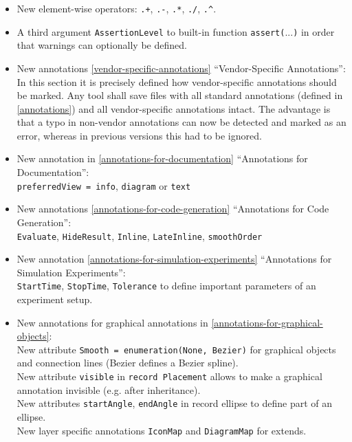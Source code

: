 \begin{itemize}
\item
  New element-wise operators: \lstinline!.+!, \lstinline!.-!, \lstinline!.*!, \lstinline!./!, \lstinline!.^!.
\item
  A third argument \lstinline!AssertionLevel! to built-in function \lstinline!assert(!...\lstinline!)! in
  order that warnings can optionally be defined.
\item
  New annotations \autoref{vendor-specific-annotations} ``Vendor-Specific Annotations'':\\
  In this section it is precisely defined how vendor-specific
  annotations should be marked. Any tool shall save files with all
  standard annotations (defined in \autoref{annotations}) and all vendor-specific
  annotations intact. The advantage is that a typo in non-vendor
  annotations can now be detected and marked as an error, whereas in
  previous versions this had to be ignored.
\item
  New annotation in \autoref{annotations-for-documentation} ``Annotations for Documentation'':\\
  \lstinline!preferredView = info!, \lstinline!diagram! or \lstinline!text!
\item
  New annotations \autoref{annotations-for-code-generation} ``Annotations for Code Generation'':\\
  \lstinline!Evaluate!, \lstinline!HideResult!, \lstinline!Inline!,
	\lstinline!LateInline!, \lstinline!smoothOrder!
\item
  New annotation \autoref{annotations-for-simulation-experiments} ``Annotations for Simulation
  Experiments'':\\
  \lstinline!StartTime!, \lstinline!StopTime!, \lstinline!Tolerance! to define important parameters of an
  experiment setup.
\item
  New annotations for graphical annotations in \autoref{annotations-for-graphical-objects}:\\
  New attribute \lstinline!Smooth = enumeration(None, Bezier)! for graphical objects
  and connection lines (Bezier defines a Bezier spline).\\
  New attribute \lstinline!visible! in \lstinline!record Placement! allows to make a graphical
  annotation invisible (e.g. after inheritance).\\
  New attributes \lstinline!startAngle!, \lstinline!endAngle! in record ellipse to define part
  of an ellipse.\\
  New layer specific annotations \lstinline!IconMap! and \lstinline!DiagramMap! for extends.\\

\end{itemize}
